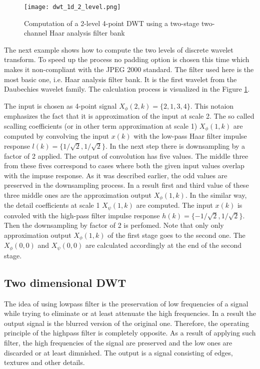 \begin{figure}
    \centering
    \texttt{[image: dwt\_1d\_2\_level.png]}
    \caption{Computation of a 2-level 4-point DWT using a two-stage two-channel Haar analysis filter bank \cite{dwt_impl}}
    \label{fig:dwt_1d_2_level}
\end{figure}

The next example shows how to compute the two levels of discrete wavelet transform. To speed up the process
no padding option is chosen this time which makes it non-compliant with the JPEG 2000 standard.
The filter used here is the most basic one, i.e. Haar analysis filter bank. It is the first wavelet
from the Daubechies wavelet family. The calculation process is visualized in the Figure \ref{fig:dwt_1d_2_level}. \cite{dwt_impl}

The input is chosen as 4-point signal $X_{\phi}(2, k) = \{2, 1, 3, 4\}$. This notaion emphasizes the fact
that it is approximation of the input at scale 2. The so called scalling coefficients (or in other term
approximation at scale 1) $X_{\phi}(1, k)$ are computed by convolving the input $x(k)$ with the low-pass
Haar filter impulse response $l(k) = \{1/\sqrt{2}, 1/\sqrt{2}\}$. In the next step there is downsampling
by a factor of 2 applied. The output of convolution has five values. The middle three from these fives 
correspond to cases where both the given input values overlap with the impuse response. As it was described
earlier, the odd values are preserved in the downsampling process. In a result first and third value of these
three middle ones are the approximation output $X_{\phi}(1, k)$. In the similar way, the detail coefficients
at scale 1 $X_{\psi}(1, k)$ are computed. The input $x(k)$ is convoled with the high-pass filter impulse
response $h(k) = \{-1/\sqrt{2}, 1/\sqrt{2}\}$. Then the downsampling by factor of 2 is perfomed.
Note that only only approximation output $X_{\phi}(1, k)$ of the first stage goes to the second one.
The $X_{\phi}(0, 0)$ and $X_{\psi}(0, 0)$ are calculated accordingly at the end of the second stage. \cite{dwt_impl}

\subsection{Two dimensional DWT}

The idea of using lowpass filter is the preservation of low frequencies of a signal while trying
to eliminate or at least attenuate the high frequencies. In a result the output signal is the blurred
version of the original one. Therefore, the operating principle of the highpass filter is completely
opposite. As a result of applying such filter, the high frequencies of the signal are preserved and
the low ones are discarded or at least dimnished. The output is a signal consisting of edges, textures
and other details. \cite{jpeg_suite} 

